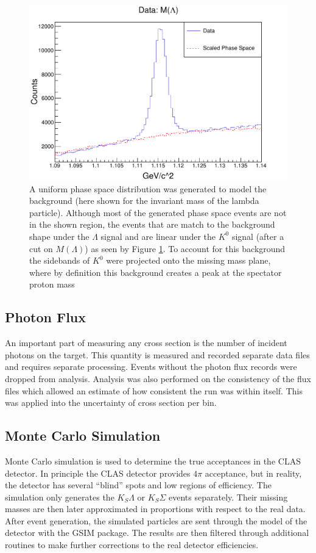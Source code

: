 \documentclass[prb,10pt,twocolumn,tightenlines,superscriptaddress]{revtex4-1}
\begin{document}
\begin{figure}[h]
    \centering
      \includegraphics[width=\linewidth, height = 3in, keepaspectratio = true]{lamphase}
    \caption{A uniform phase space distribution was generated to model the background (here shown for the invariant mass of the lambda particle). Although most of the generated phase space events are not in the shown region, the events that are match to the background shape under the $\Lambda$ signal and are linear under the $K^{0}$ signal (after a cut on $M(\Lambda)$) as seen by Figure \ref{fig:lamphase}. To account for this background the sidebands of $K^{0}$ were projected onto the missing mass plane, where by definition this background creates a peak at the spectator proton mass}
        \label{fig:lamphase}%
\end{figure}

\subsection{Photon Flux}
An important part of measuring any cross section is the number of incident photons on the target. This quantity is measured and recorded separate data files and requires separate processing. Events without the photon flux records were dropped from analysis. Analysis was also performed on the consistency of the flux files which allowed an estimate of how consistent the run was within itself. This was applied into the uncertainty of cross section per bin. 

\subsection{Monte Carlo Simulation}
Monte Carlo simulation is used to determine the true acceptances in the CLAS detector. In principle the CLAS detector provides $4\pi$ acceptance, but in reality, the detector has several ``blind'' spots and low regions of efficiency. The simulation only generates the $K_{S}\Lambda$ or $K_{S}\Sigma$ events separately.
Their missing masses are then later approximated in proportions with respect to the real data. After event generation, the simulated particles are sent through the model of the detector with the GSIM package. The results are then filtered through additional routines to make further corrections to the real detector efficiencies.  
\end{document}
